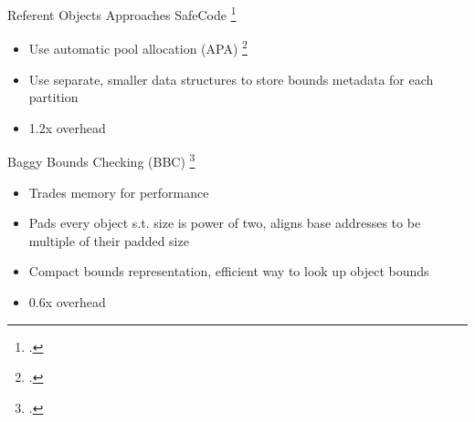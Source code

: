 \documentclass[aspectratio=169]{beamer}
\begin{document}
\begin{frame}[fragile]{Referent Objects Approaches}
SafeCode \footcite{dhurjati_2006_backwards}
    \begin{itemize}
        \item Use automatic pool allocation (APA) \footcite{lattner_automatic_2005} 
        \item Use separate, \alert{smaller} data structures to store bounds metadata for \alert{each partition}
        \item 1.2x overhead
    \end{itemize}
\vspace{0.2in}

Baggy Bounds Checking (BBC) \footcite{akritidis_baggy_2009}
    \begin{itemize}
    \item Trades memory for performance 
    \item Pads every object s.t. size is power of two, aligns base addresses to be multiple of their padded size
    \item Compact bounds representation, efficient way to look up object bounds
    \item 0.6x overhead 
    \end{itemize}
\vspace{0.2in}

\end{frame}
\end{document}

